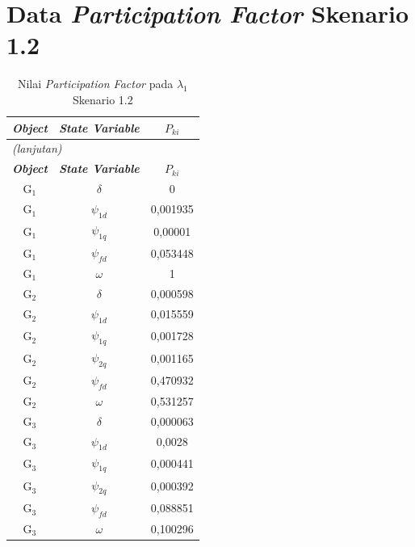 \section{Data \textit{Participation Factor} Skenario 1.2}
\begingroup
\fontsize{12}{14.4}\selectfont
\setlength{\tabcolsep}{8pt}
\begin{longtable}{c c c} \caption[]{Nilai
	\textit{Participation Factor} pada $\lambda_1$ Skenario 1.2}
	\label{tab:prf_sk12_lampiran} \\
	\toprule
	\multicolumn{1}{c}{\textbf{\textit{Object}}} & \textbf{\textit{State
	Variable}} & \textbf{$P_{ki}$} \\
	\midrule
	\endfirsthead
	\multicolumn{3}{l}{\textit{(lanjutan)}} \\
	\toprule
	\multicolumn{1}{c}{\textbf{\textit{Object}}} & \textbf{\textit{State
	Variable}} & \textbf{$P_{ki}$} \\
	\midrule
	\endhead
	\bottomrule
	\endfoot
	G$_1$ & $\delta$   & 0        \\
	G$_1$ & $\psi_{1d}$ & 0,001935 \\
	G$_1$ & $\psi_{1q}$ & 0,00001  \\
	G$_1$ & $\psi_{fd}$ & 0,053448 \\
	G$_1$ & $\omega$ & 1        \\
	G$_2$ & $\delta$   & 0,000598 \\
	G$_2$ & $\psi_{1d}$ & 0,015559 \\
	G$_2$ & $\psi_{1q}$ & 0,001728 \\
	G$_2$ & $\psi_{2q}$ & 0,001165 \\
	G$_2$ & $\psi_{fd}$ & 0,470932 \\
	G$_2$ & $\omega$ & 0,531257 \\
	G$_3$ & $\delta$   & 0,000063 \\
	G$_3$ & $\psi_{1d}$ & 0,0028   \\
	G$_3$ & $\psi_{1q}$ & 0,000441 \\
	G$_3$ & $\psi_{2q}$ & 0,000392 \\
	G$_3$ & $\psi_{fd}$ & 0,088851 \\
	G$_3$ & $\omega$ & 0,100296 \\
\end{longtable}
\par
\endgroup

